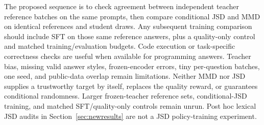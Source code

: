 The proposed sequence is to check agreement between independent teacher
reference batches on the same prompts, then compare conditional JSD
and MMD on identical references and student draws. Any subsequent
training comparison should include SFT on those same reference answers,
plus a quality-only control and matched training/evaluation budgets.
Code execution or task-specific correctness checks are useful when
available for programming answers. Teacher bias, missing valid answer
styles, frozen-encoder errors, tiny per-question batches, one seed, and
public-data overlap remain limitations. Neither MMD nor JSD supplies
a trustworthy target by itself, replaces the quality reward, or
guarantees conditional randomness. Larger frozen-teacher reference sets,
conditional-JSD training, and matched SFT/quality-only controls remain
unrun. Post hoc lexical JSD audits in Section~\ref{sec:newresults} are
not a JSD policy-training experiment.
